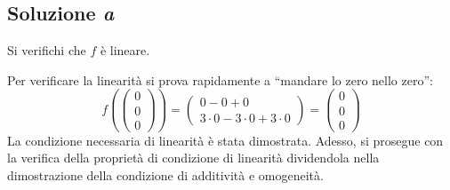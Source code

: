 \documentclass[a4paper]{article}
\newcommand{\dquotes}[1]{``#1''}
\begin{document}
	\subsection{Soluzione \emph{a}}
	
	Si verifichi che $f$ è lineare.\newline
	
	\noindent
	Per verificare la linearità si prova rapidamente a \dquotes{mandare lo zero nello zero}:
	\begin{equation*}
		f\left( \begin{pmatrix}
			0 \\ 0 \\ 0
		\end{pmatrix} \right) = \begin{pmatrix}
			0 - 0 + 0 \\
			3\cdot 0 - 3 \cdot 0 + 3 \cdot 0
		\end{pmatrix} = \begin{pmatrix}
			0 \\ 0 \\ 0
		\end{pmatrix}
	\end{equation*}
	La condizione necessaria di linearità è stata dimostrata. Adesso, si prosegue con la verifica della proprietà di condizione di linearità dividendola nella dimostrazione della condizione di additività e omogeneità.
\end{document}
